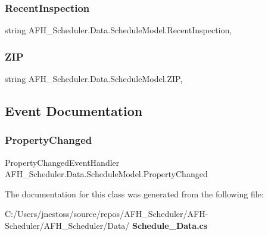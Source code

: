 \mbox{\label{class_a_f_h___scheduler_1_1_data_1_1_schedule_model_a868655df065cde527295aeb486dac312}} 
\subsubsection{RecentInspection}
{\footnotesize\ttfamily string A\+F\+H\+\_\+\+Scheduler.\+Data.\+Schedule\+Model.\+Recent\+Inspection\hspace{0.3cm}{\ttfamily [get]}, {\ttfamily [set]}}

\mbox{\label{class_a_f_h___scheduler_1_1_data_1_1_schedule_model_a3f2af7dd9e68634cf37f5ddf3546fe9d}} 
\subsubsection{ZIP}
{\footnotesize\ttfamily string A\+F\+H\+\_\+\+Scheduler.\+Data.\+Schedule\+Model.\+Z\+IP\hspace{0.3cm}{\ttfamily [get]}, {\ttfamily [set]}}



\subsection{Event Documentation}
\mbox{\label{class_a_f_h___scheduler_1_1_data_1_1_schedule_model_a951bacabdc3a2ba2eeefe156466829f6}} 
\subsubsection{PropertyChanged}
{\footnotesize\ttfamily Property\+Changed\+Event\+Handler A\+F\+H\+\_\+\+Scheduler.\+Data.\+Schedule\+Model.\+Property\+Changed}



The documentation for this class was generated from the following file\+:\begin{DoxyCompactItemize}
\item 
C\+:/\+Users/jnestoss/source/repos/\+A\+F\+H\+\_\+\+Scheduler/\+A\+F\+H-\/\+Scheduler/\+A\+F\+H\+\_\+\+Scheduler/\+Data/\textbf{ Schedule\+\_\+\+Data.\+cs}\end{DoxyCompactItemize}
